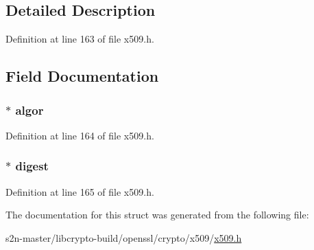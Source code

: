\subsection{Detailed Description}


Definition at line 163 of file x509.\+h.



\subsection{Field Documentation}
\subsubsection[{\texorpdfstring{algor}{algor}}]{ $\ast$ algor}\hypertarget{struct_x509__sig__st_a22b96fe8b8a2f288e3672f438d25b232}{}\label{struct_x509__sig__st_a22b96fe8b8a2f288e3672f438d25b232}


Definition at line 164 of file x509.\+h.

\subsubsection[{\texorpdfstring{digest}{digest}}]{ $\ast$ digest}\hypertarget{struct_x509__sig__st_ac51bfebf9ca26f5d9cb1f71701a25024}{}\label{struct_x509__sig__st_ac51bfebf9ca26f5d9cb1f71701a25024}


Definition at line 165 of file x509.\+h.



The documentation for this struct was generated from the following file\+:\begin{DoxyCompactItemize}
\item 
s2n-\/master/libcrypto-\/build/openssl/crypto/x509/\hyperlink{crypto_2x509_2x509_8h}{x509.\+h}\end{DoxyCompactItemize}
